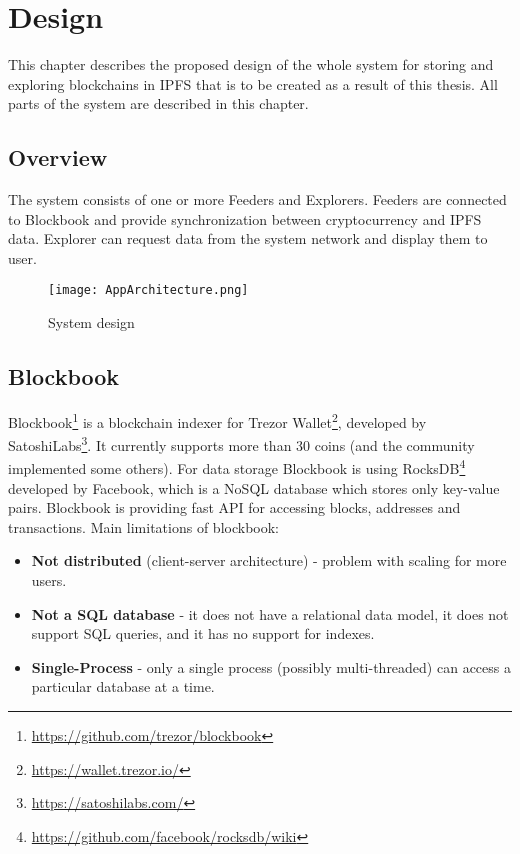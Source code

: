 \chapter{Design}
\label{Design}
This chapter describes the proposed design of the whole system for storing and exploring blockchains in IPFS that is to be
created as a result of this thesis. All parts of the system are described in this chapter.

\section{Overview}
The system consists of one or more Feeders and Explorers. Feeders are connected to Blockbook and provide synchronization between cryptocurrency and IPFS data. Explorer can request data from the system network and display them to user.

\begin{figure}[h]
    \centering
    \texttt{[image: AppArchitecture.png]}
    \caption{System design}
    \label{}
\end{figure}

\section{Blockbook}
Blockbook\footnote{\url{https://github.com/trezor/blockbook}} is a blockchain indexer for Trezor Wallet\footnote{\url{https://wallet.trezor.io/}}, developed by SatoshiLabs\footnote{\url{https://satoshilabs.com/}}. It currently supports more than 30 coins (and the community implemented some others). For data storage Blockbook is using RocksDB\footnote{\url{https://github.com/facebook/rocksdb/wiki}} developed by Facebook, which is a NoSQL database which stores only key-value pairs. Blockbook is providing fast API for accessing blocks, addresses and transactions. Main limitations of blockbook:
\begin{itemize}
    \item \textbf{Not distributed} (client-server architecture) - problem with scaling for more users. 
    \item \textbf{Not a SQL database} - it does not have a relational data model, it does not support SQL queries, and it has no support for indexes.
    \item \textbf{Single-Process} - only a single process (possibly multi-threaded) can access a particular database at a time.
\end{itemize}

